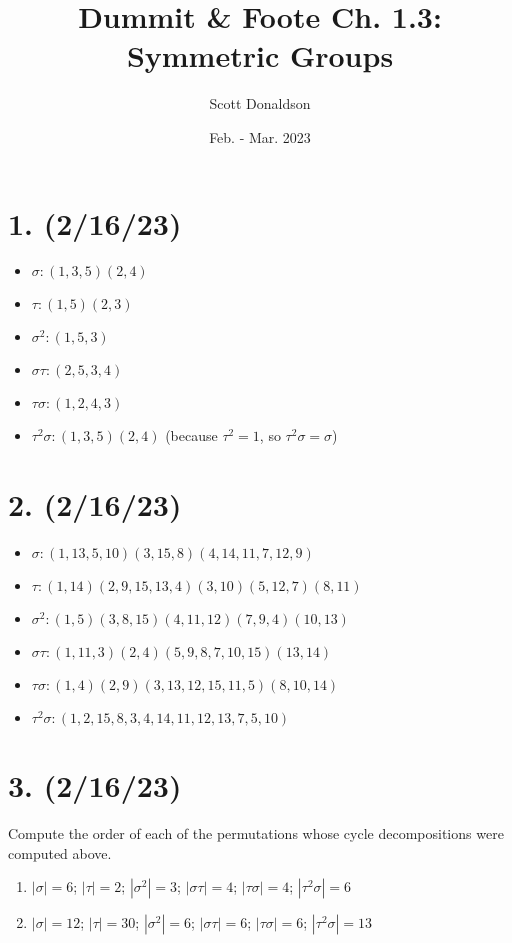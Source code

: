 \documentclass{article}
\title{Dummit \& Foote Ch. 1.3: Symmetric Groups}
\author{Scott Donaldson}
\date{Feb. - Mar. 2023}
\begin{document}
\maketitle

\section*{1. (2/16/23)}

\begin{itemize}
    \item $\sigma: (1, 3, 5)(2, 4)$
    \item $\tau: (1, 5)(2, 3)$
    \item $\sigma^2: (1, 5, 3)$
    \item $\sigma \tau: (2, 5, 3, 4)$
    \item $\tau \sigma: (1, 2, 4, 3)$
    \item $\tau^2 \sigma: (1, 3, 5)(2, 4)$ (because $\tau^2 = 1$, so $\tau^2 \sigma = \sigma$)
\end{itemize}

\section*{2. (2/16/23)}

\begin{itemize}
    \item $\sigma: (1,13,5,10)(3,15,8)(4,14,11,7,12,9)$
    \item $\tau: (1, 14)(2, 9, 15, 13, 4)(3, 10)(5, 12, 7)(8, 11)$
    \item $\sigma^2: (1, 5)(3, 8, 15)(4, 11, 12)(7, 9, 4)(10, 13)$
    \item $\sigma \tau: (1, 11, 3)(2, 4)(5, 9, 8, 7, 10, 15)(13, 14)$
    \item $\tau \sigma: (1, 4)(2, 9)(3, 13, 12, 15, 11, 5)(8, 10, 14)$
    \item $\tau^2 \sigma: (1, 2, 15, 8, 3, 4, 14, 11, 12, 13, 7, 5, 10)$
\end{itemize}

\section*{3. (2/16/23)}

Compute the order of each of the permutations whose cycle decompositions were computed above.

\begin{enumerate}
    \item $|\sigma| = 6$; $|\tau| = 2$; $|\sigma^2| = 3$; $|\sigma \tau| = 4$; $|\tau \sigma| = 4$; $|\tau^2 \sigma| = 6$
    \item $|\sigma| = 12$; $|\tau| = 30$; $|\sigma^2| = 6$; $|\sigma \tau| = 6$; $|\tau \sigma| = 6$; $|\tau^2 \sigma| = 13$
\end{enumerate}
\end{document}
